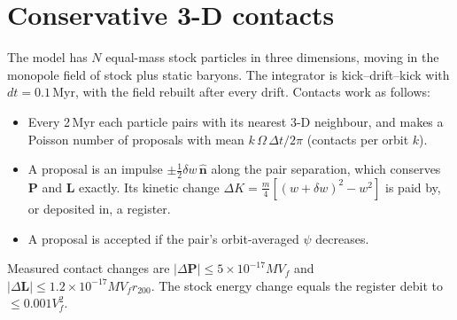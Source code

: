 \section{Conservative 3-D contacts}
The model has $N$ equal-mass stock particles in three dimensions, moving in the monopole field of stock plus static baryons. The integrator is kick--drift--kick with $dt=0.1$\,Myr, with the field rebuilt after every drift. Contacts work as follows:
\begin{itemize}
\item Every 2\,Myr each particle pairs with its nearest 3-D neighbour, and makes a Poisson number of proposals with mean $k\,\Omega\,\Delta t/2\pi$ (contacts per orbit $k$).
\item A proposal is an impulse $\pm\tfrac12\delta w\,\hat{\mathbf n}$ along the pair separation, which conserves $\mathbf P$ and $\mathbf L$ exactly. Its kinetic change $\Delta K=\tfrac m4[(w+\delta w)^2-w^2]$ is paid by, or deposited in, a register.
\item A proposal is accepted if the pair's orbit-averaged $\psi$ decreases.
\end{itemize}
Measured contact changes are $|\Delta\mathbf P|\le5\times10^{-17}MV_f$ and $|\Delta\mathbf L|\le1.2\times10^{-17}MV_fr_{200}$. The stock energy change equals the register debit to $\le0.001V_f^2$.

